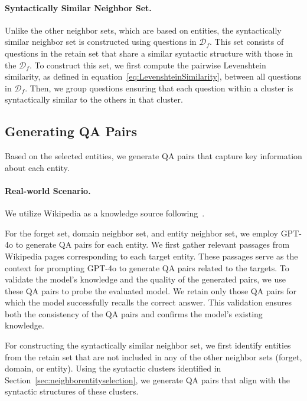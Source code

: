 \paragraph{Syntactically Similar Neighbor Set.} Unlike the other neighbor sets, which are based on entities, the syntactically similar neighbor set is constructed using questions in $\mathcal{D}_f$. This set consists of questions in the retain set that share a similar syntactic structure with those in the $\mathcal{D}_f$. To construct this set, we first compute the pairwise Levenshtein similarity, as defined in equation~\ref{eq:LevenshteinSimilarity}, between all questions in $\mathcal{D}_f$. Then, we group questions ensuring that each question within a cluster is syntactically similar to the others in that cluster.

\subsection{Generating QA Pairs}
Based on the selected entities, we generate QA pairs that capture key information about each entity.
\paragraph{Real-world Scenario.}
We utilize Wikipedia as a knowledge source following~\citet{rwku}.

For the forget set, domain neighbor set, and entity neighbor set, we employ GPT-4o to generate QA pairs for each entity.  We first gather relevant passages from Wikipedia pages corresponding to each target entity.  These passages serve as the context for prompting GPT-4o to generate QA pairs related to the targets.  To validate the model's knowledge and the quality of the generated pairs, we use these QA pairs to probe the evaluated model. We retain only those QA pairs for which the model successfully recalls the correct answer. This validation ensures both the consistency of the QA pairs and confirms the model's existing knowledge. 

For constructing the syntactically similar neighbor set, we first identify entities from the retain set that are not included in any of the other neighbor sets (forget, domain, or entity). Using the syntactic clusters identified in Section~\ref{sec:neighborentityselection}, we generate QA pairs that align with the syntactic structures of these clusters.

